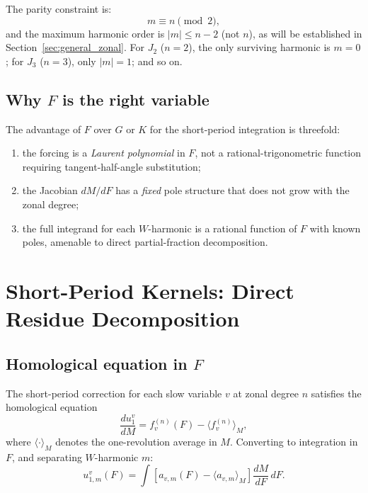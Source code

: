 \documentclass[11pt]{article}
\begin{document}
The parity constraint is:
\begin{equation}
m \equiv n \pmod{2},
\end{equation}
and the maximum harmonic order is $|m| \le n-2$ (not $n$), as will be
established in Section~\ref{sec:general_zonal}. For $J_2$ ($n=2$),
the only surviving harmonic is $m = 0$; for $J_3$ ($n=3$), only $|m| = 1$;
and so on.

\subsection{Why $F$ is the right variable}

The advantage of $F$ over $G$ or $K$ for the short-period integration is
threefold:
\begin{enumerate}
    \item the forcing is a \emph{Laurent polynomial} in $F$, not a
    rational-trigonometric function requiring tangent-half-angle substitution;
    \item the Jacobian $dM/dF$ has a \emph{fixed} pole structure that does not
    grow with the zonal degree;
    \item the full integrand for each $W$-harmonic is a rational function of
    $F$ with known poles, amenable to direct partial-fraction decomposition.
\end{enumerate}

\section{Short-Period Kernels: Direct Residue Decomposition}
\label{sec:residue}

\subsection{Homological equation in $F$}

The short-period correction for each slow variable $v$ at zonal degree $n$
satisfies the homological equation
\begin{equation}
\frac{du_1^v}{dM}
= f^{(n)}_v(F) - \langle f^{(n)}_v \rangle_M,
\label{eq:homological_F}
\end{equation}
where $\langle \cdot \rangle_M$ denotes the one-revolution average in $M$.
Converting to integration in $F$, and separating $W$-harmonic $m$:
\begin{equation}
u_{1,m}^v(F)
= \int \left[a_{v,m}(F) - \langle a_{v,m} \rangle_M \right]
\frac{dM}{dF}\, dF.
\label{eq:u1_F_integral}
\end{equation}
\end{document}
